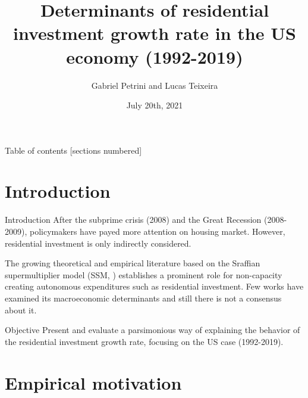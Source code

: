 \documentclass[10pt]{beamer}
\institute{Institute of Economics - University of Campinas/Brazil}
\author{Gabriel Petrini and Lucas Teixeira}
\date{July 20th, 2021}
\title{Determinants of residential investment growth rate in the US economy (1992-2019)}
\begin{document}
\maketitle





\begin{frame}{Table of contents}
  [sections numbered]
  \tableofcontents[hideallsubsections]
\end{frame}

\section{Introduction}
\label{sec:orgac7795d}

\begin{frame}[label={sec:org0dd9f50}]{Introduction}
After the subprime crisis (2008) and the Great Recession (2008-2009), policymakers have payed more attention on housing market.
However, residential investment is only \alert{indirectly} considered.

The growing theoretical and empirical literature based on the Sraffian supermultiplier model (SSM, \cites{serrano_long_1995}{bortis_institutions_1997}) establishes a prominent role for non-capacity creating autonomous expenditures such as \alert{residential investment}.
Few works have examined its \alert{macroeconomic} determinants and still there is not a consensus about it.


\begin{block}{Objective}
Present and evaluate a parsimonious way of explaining the behavior of the residential investment growth rate, focusing on the US case (1992-2019).
\end{block}
\end{frame}

\section{Empirical motivation}
\label{sec:org00dc828}
\end{document}
